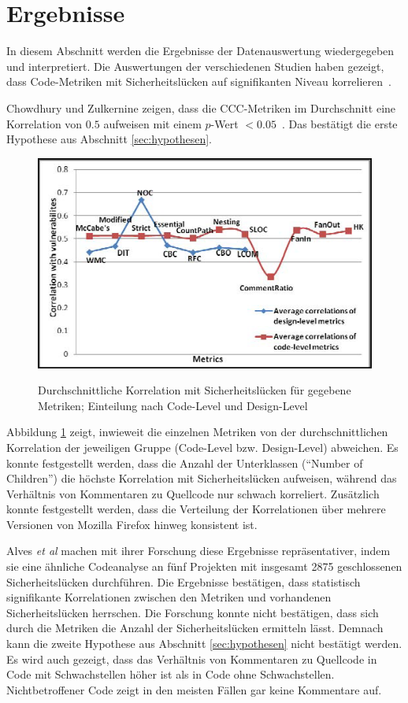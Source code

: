 \section{Ergebnisse}
\label{sec:ergebnisse}
In diesem Abschnitt werden die Ergebnisse der Datenauswertung wiedergegeben und interpretiert.
Die Auswertungen der verschiedenen Studien haben gezeigt, dass Code-Metriken mit Sicherheitslücken auf signifikanten Niveau korrelieren~\cite{chowdhury_zulkernine_2010,chowdhury_zulkernine_2009,alves_et_al}.

Chowdhury und Zulkernine zeigen, dass die CCC-Metriken im Durchschnitt eine Korrelation von $0.5$ aufweisen mit einem $p$-Wert $< 0.05$~\cite{chowdhury_zulkernine_2010}.
Das bestätigt die erste Hypothese aus Abschnitt \ref{sec:hypothesen}.
\begin{figure}
	\includegraphics[width=\textwidth]{img/code_vs_design.png}
	\label{fig:code_vs_design}
	\caption{Durchschnittliche Korrelation mit Sicherheitslücken für gegebene Metriken; Einteilung nach Code-Level und Design-Level~\cite{chowdhury_zulkernine_2010}}
\end{figure}
Abbildung \ref{fig:code_vs_design} zeigt, inwieweit die einzelnen Metriken von der durchschnittlichen Korrelation der jeweiligen Gruppe (Code-Level bzw. Design-Level) abweichen.
Es konnte festgestellt werden, dass die Anzahl der Unterklassen ("`Number of Children"') die höchste Korrelation mit Sicherheitslücken aufweisen, während das Verhältnis von Kommentaren zu Quellcode nur schwach korreliert.
Zusätzlich konnte festgestellt werden, dass die Verteilung der Korrelationen über mehrere Versionen von Mozilla Firefox hinweg konsistent ist.

Alves \emph{et al} \cite{alves_et_al} machen mit ihrer Forschung diese Ergebnisse repräsentativer, indem sie eine ähnliche Codeanalyse an fünf Projekten mit insgesamt 2875 geschlossenen Sicherheitslücken durchführen.
Die Ergebnisse bestätigen, dass statistisch signifikante Korrelationen zwischen den Metriken und vorhandenen Sicherheitslücken herrschen.
Die Forschung konnte nicht bestätigen, dass sich durch die Metriken die Anzahl der Sicherheitslücken ermitteln lässt.
Demnach kann die zweite Hypothese aus Abschnitt \ref{sec:hypothesen} nicht bestätigt werden.
Es wird auch gezeigt, dass das Verhältnis von Kommentaren zu Quellcode in Code mit Schwachstellen höher ist als in Code ohne Schwachstellen.
Nichtbetroffener Code zeigt in den meisten Fällen gar keine Kommentare auf.

